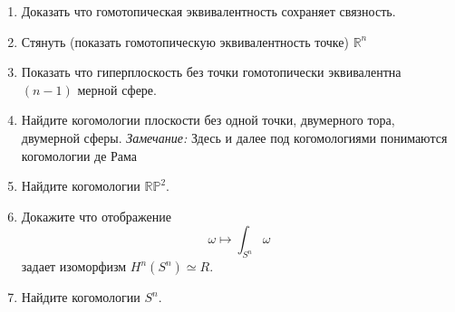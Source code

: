 \documentclass{article}
\theoremstyle{definition}
\newtheorem{theorem}{Th}
\begin{document}
\begin{enumerate}
 \begin{theorem}[Пуанкаре]
 	Любая замкнутая форма $\omega \in \Omega^p(G)$ в звездной области $G$ точна.
 \end{theorem}
 Назовём отображения $g,f: X \mapsto Y$ гомотопными если существует отображение $F: X \times [0,1] \mapsto Y$, такое что $F(x,0) = f(x)$, $F(x,1) = g(x)$.
 
 Многообразия $X$ и $Y$ называются гомотопически эквивалентными, если существуют гладкие отображение $f: X \mapsto Y$ и $g: Y \mapsto X$, такие, что их композиции гомотопны тождественным отображениям.
 
 \vspace{3ex}
 \item Доказать что гомотопическая эквивалентность сохраняет связность.
 \item Стянуть (показать гомотопическую эквивалентность точке) $\mathbb{R}^n$
 \item Показать что гиперплоскость без точки гомотопически эквивалентна $(n-1)$ мерной сфере.

 \item Найдите когомологии плоскости без одной точки, двумерного тора, двумерной сферы.  \textit{Замечание:} Здесь и далее под когомологиями понимаются когомологии де Рама
 \item Найдите когомологии $\mathbb{RP}^2$.
 \item Докажите что отображение 
 $$ \omega \mapsto \int_{S^n} \omega$$
 задает изоморфизм $H^n(S^n) \simeq R$.
 \item Найдите когомологии $S^n$.


 
 

\end{enumerate}
\vspace{\fill}
\end{document}
